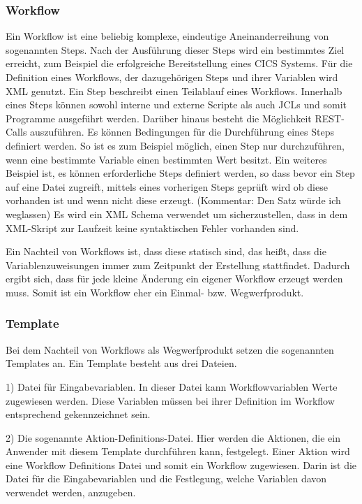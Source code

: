\subsubsection{Workflow}\label{sssec:workflow}
Ein Workflow ist eine beliebig komplexe, eindeutige Aneinanderreihung von sogenannten Steps.
Nach der Ausführung dieser Steps wird ein bestimmtes Ziel erreicht, zum Beispiel die erfolgreiche Bereitstellung eines CICS Systems.
Für die Definition eines Workflows, der dazugehörigen Steps und ihrer Variablen wird XML genutzt.
Ein Step beschreibt einen Teilablauf eines Workflows.
Innerhalb eines Steps können sowohl interne und externe Scripte als auch JCLs und somit Programme ausgeführt werden.
Darüber hinaus besteht die Möglichkeit REST-Calls auszuführen.
Es können Bedingungen für die Durchführung eines Steps definiert werden.
So ist es zum Beispiel möglich, einen Step nur durchzuführen, wenn eine bestimmte Variable einen bestimmten Wert besitzt.
Ein weiteres Beispiel ist, es können erforderliche Steps definiert werden, so dass bevor ein Step auf eine Datei zugreift, mittels eines vorherigen Steps geprüft wird ob diese vorhanden ist und wenn nicht diese erzeugt. (Kommentar: Den Satz würde ich weglassen)
Es wird ein XML Schema verwendet um sicherzustellen, dass in dem XML-Skript zur Laufzeit keine syntaktischen Fehler vorhanden sind.
\cite{Rotthove.2018}

Ein Nachteil von Workflows ist, dass diese statisch sind, das heißt, dass die Variablenzuweisungen immer zum Zeitpunkt der Erstellung stattfindet.
Dadurch ergibt sich, dass für jede kleine Änderung ein eigener Workflow erzeugt werden muss.
Somit ist ein Workflow eher ein Einmal- bzw. Wegwerfprodukt.

\subsubsection{Template}
Bei dem Nachteil von Workflows als Wegwerfprodukt setzen die sogenannten Templates an.
Ein Template besteht aus drei Dateien.

1) Datei für Eingabevariablen.
In dieser Datei kann Workflowvariablen Werte zugewiesen werden.
Diese Variablen müssen bei ihrer Definition im Workflow entsprechend gekennzeichnet sein.

2) Die sogenannte Aktion-Definitions-Datei.
Hier werden die Aktionen, die ein Anwender mit diesem Template durchführen kann, festgelegt.
Einer Aktion wird eine Workflow Definitions Datei und somit ein Workflow zugewiesen.
Darin ist die Datei für die Eingabevariablen und die Festlegung, welche Variablen davon verwendet werden, anzugeben.

